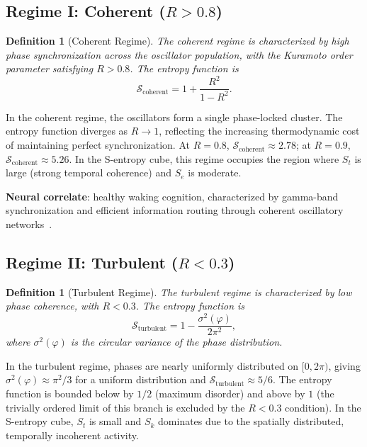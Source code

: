 \documentclass[aps,prd,twocolumn,superscriptaddress,floatfix,nofootinbib]{revtex4-2}
\newtheorem{definition}[theorem]{Definition}
\theoremstyle{remark}
\newcommand{\Sk}{S_k}
\newcommand{\St}{S_t}
\newcommand{\Se}{S_e}
\newcommand{\Rorder}{R}
\newcommand{\Sregime}{\mathcal{S}}
\begin{document}
\subsection{Regime I: Coherent ($\Rorder > 0.8$)}

\begin{definition}[Coherent Regime]
\label{def:coherent}
The coherent regime is characterized by high phase synchronization across the oscillator population, with the Kuramoto order parameter satisfying $\Rorder > 0.8$. The entropy function is
\begin{equation}
    \boxed{\Sregime_{\text{coherent}} = 1 + \frac{\Rorder^2}{1 - \Rorder^2}.}
    \label{eq:s_coherent}
\end{equation}
\end{definition}

In the coherent regime, the oscillators form a single phase-locked cluster. The entropy function diverges as $\Rorder \to 1$, reflecting the increasing thermodynamic cost of maintaining perfect synchronization. At $\Rorder = 0.8$, $\Sregime_{\text{coherent}} \approx 2.78$; at $\Rorder = 0.9$, $\Sregime_{\text{coherent}} \approx 5.26$. In the S-entropy cube, this regime occupies the region where $\St$ is large (strong temporal coherence) and $\Se$ is moderate.

\textbf{Neural correlate}: healthy waking cognition, characterized by gamma-band synchronization and efficient information routing through coherent oscillatory networks~\cite{fries2005mechanism,fries2015rhythms}.

\subsection{Regime II: Turbulent ($\Rorder < 0.3$)}

\begin{definition}[Turbulent Regime]
\label{def:turbulent}
The turbulent regime is characterized by low phase coherence, with $\Rorder < 0.3$. The entropy function is
\begin{equation}
    \boxed{\Sregime_{\text{turbulent}} = 1 - \frac{\sigma^2(\varphi)}{2\pi^2},}
    \label{eq:s_turbulent}
\end{equation}
where $\sigma^2(\varphi)$ is the circular variance of the phase distribution.
\end{definition}

In the turbulent regime, phases are nearly uniformly distributed on $[0, 2\pi)$, giving $\sigma^2(\varphi) \approx \pi^2/3$ for a uniform distribution and $\Sregime_{\text{turbulent}} \approx 5/6$. The entropy function is bounded below by $1/2$ (maximum disorder) and above by $1$ (the trivially ordered limit of this branch is excluded by the $\Rorder < 0.3$ condition). In the S-entropy cube, $\St$ is small and $\Sk$ dominates due to the spatially distributed, temporally incoherent activity.
\end{document}
